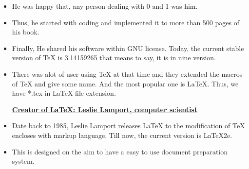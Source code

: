 \documentclass{article}
\begin{document}
\begin{itemize}
\item He was happy that, any person dealing with 0 and 1 was him.


\item Thus, he started with coding and implemented it to more than 500 pages of his book.


\item Finally, He shared his software within GNU license. 
Today, the current stable version of \TeX\hspace{0.1cm} is 3.14159265 that means to say, it is in nine version. 


\item There was alot of user using TeX at that time and they extended the macros of \TeX\hspace{0.1cm} and give some name. And the most popular one is \LaTeX. Thus, we have \textsf{*.tex} in \LaTeX \hspace{0.1cm} file extension. 

\noindent \underline{\bfseries Creator of \LaTeX: Leslie Lamport, computer scientist}
\vspace{0.2cm}

\item Date back to 1985, Leslie Lamport releases \LaTeX\hspace{0.1cm} to the modification of \TeX \hspace{0.1cm} encloses with markup language. Till now, the current version is \LaTeX2e. 

\item This is designed on the aim to have a easy to use document preparation system.

\end{itemize}
\end{document}
